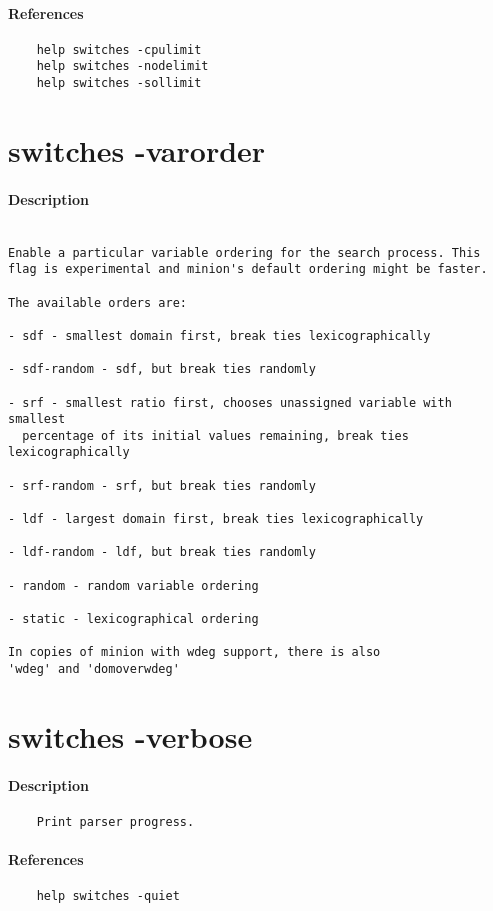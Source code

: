 \paragraph{References}
{\footnotesize
\begin{verbatim}
    help switches -cpulimit
    help switches -nodelimit
    help switches -sollimit
\end{verbatim}
}
\section{switches -varorder}
\paragraph{Description}
{\footnotesize
\begin{verbatim}

Enable a particular variable ordering for the search process. This
flag is experimental and minion's default ordering might be faster.

The available orders are:

- sdf - smallest domain first, break ties lexicographically

- sdf-random - sdf, but break ties randomly

- srf - smallest ratio first, chooses unassigned variable with smallest
  percentage of its initial values remaining, break ties lexicographically

- srf-random - srf, but break ties randomly

- ldf - largest domain first, break ties lexicographically

- ldf-random - ldf, but break ties randomly

- random - random variable ordering

- static - lexicographical ordering

In copies of minion with wdeg support, there is also
'wdeg' and 'domoverwdeg'
\end{verbatim}
}
\section{switches -verbose}
\paragraph{Description}
{\footnotesize
\begin{verbatim}
    Print parser progress.
\end{verbatim}
}
\paragraph{References}
{\footnotesize
\begin{verbatim}
    help switches -quiet
\end{verbatim}
}
